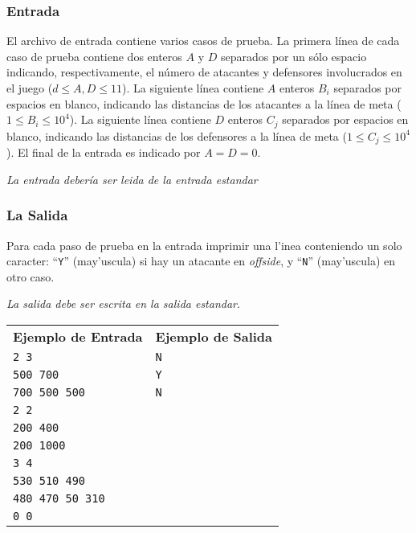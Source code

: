 \documentclass{beamer}
\begin{document}
\begin{frame}
 \frametitle{Entrada}
 El archivo de entrada contiene varios casos de prueba. La primera línea de cada caso de prueba contiene dos enteros $A$ y $D$ separados por un sólo espacio indicando, respectivamente, el número de atacantes y defensores involucrados en el juego ($d \leq A, D \leq 11$). La siguiente línea contiene $A$ enteros $B_i$ separados por espacios en blanco, indicando las distancias de los atacantes a la línea de meta ($1 \leq B_i \leq 10^4$). La siguiente línea contiene $D$ enteros $C_j$ separados por espacios en blanco, indicando las distancias de los defensores a la línea de meta ($1 \leq C_j \leq 10^4$). El final de la entrada es indicado por $A = D = 0$.
 
 \emph{La entrada debería ser leida de la entrada estandar} 
\end{frame}

\begin{frame}[fragile]%
 \frametitle{La Salida}
 Para cada paso de prueba en la entrada imprimir una l'inea conteniendo un solo caracter: ``\verb|Y|'' (may'uscula) si hay un atacante en \emph{offside}, y ``\verb|N|'' (may'uscula) en otro caso.
 
 \emph{La salida debe ser escrita en la salida estandar}.
\end{frame}

\begin{frame}[fragile]
\begin{center}
\begin{tabular}{|l|l|}
 \hline
 \textbf{Ejemplo de Entrada} & \textbf{Ejemplo de Salida}\\
 \verb|2 3| &\verb|N|\\
 \verb|500 700| & \verb|Y|\\
 \verb|700 500 500| & \verb|N|\\
 \verb|2 2|& \\
 \verb|200 400|& \\
 \verb|200 1000|&\\
 \verb|3 4|&\\
 \verb|530 510 490|&\\
 \verb|480 470 50 310|&\\
 \verb|0 0|&\\
 \hline
\end{tabular}
\end{center}
 
\end{frame}

\end{document}
